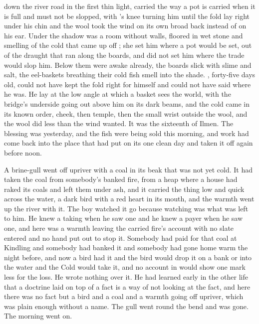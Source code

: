 
 down the river road in the first thin light, carried the way a pot is carried when it is full and must not be slopped, with 's knee turning him until the fold lay right under his chin and the wool took the wind on its own broad back instead of on his ear. Under  the shadow was a room without walls, floored in wet stone and smelling of the cold that came up off ; she set him where a pot would be set, out of the draught that ran along the boards, and did not set him where the trade would slop him. Below them  were awake already, the boards slick with slime and salt, the eel-baskets breathing their cold fish smell into the shade. , forty-five days old, could not have kept the fold right for himself and could not have said where he was. He lay at the low angle at which a basket sees the world, with the bridge's underside going out above him on its dark beams, and the cold came in its known order, cheek, then temple, then the small wrist outside the wool, and the wool did less than the wind wanted. It was the sixteenth of Ilmen. The blessing was yesterday, and the fish were being sold this morning, and work had come back into the place that had put on its one clean day and taken it off again before noon.

A brine-gull went off upriver with a coal in its beak that was not yet cold. It had taken the coal from somebody's banked fire, from a heap where a house had raked its coals and left them under ash, and it carried the thing low and quick across the water, a dark bird with a red heart in its mouth, and the warmth went up the river with it. The boy watched it go because watching was what was left to him. He knew a taking when he saw one and he knew a payer when he saw one, and here was a warmth leaving the carried fire's account with no slate entered and no hand put out to stop it. Somebody had paid for that coal at Kindling and somebody had banked it and somebody had gone home warm the night before, and now a bird had it and the bird would drop it on a bank or into the water and the Cold would take it, and no account in  would show one mark less for the loss. He wrote nothing over it. He had learned early in the other life that a doctrine laid on top of a fact is a way of not looking at the fact, and here there was no fact but a bird and a coal and a warmth going off upriver, which was plain enough without a name. The gull went round the bend and was gone. The morning went on.

